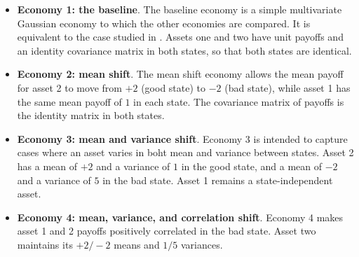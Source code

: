 \documentclass{article}
\begin{document}
\begin{itemize}
    \item \textbf{Economy 1: the baseline}. The baseline economy is a simple multivariate Gaussian economy to which the other economies are compared. It is equivalent to the case studied in \textcite{kacperczyk_rational_2016}. Assets one and two have unit payoffs and an identity covariance matrix in both states, so that both states are identical.
    
    \item \textbf{Economy 2: mean shift}. The mean shift economy allows the mean payoff for asset 2 to move from $+2$ (good state) to $-2$ (bad state), while asset 1 has the same mean payoff of $1$ in each state. The covariance matrix of payoffs is the identity matrix in both states.

    \item \textbf{Economy 3: mean and variance shift}. Economy 3 is intended to capture cases where an asset varies in boht mean and variance between states. Asset 2 has a mean of $+2$ and a variance of $1$ in the good state, and a mean of $-2$ and a variance of $5$ in the bad state. Asset 1 remains a state-independent asset.
    
    \item \textbf{Economy 4: mean, variance, and correlation shift}. Economy 4 makes asset 1 and 2 payoffs positively correlated in the bad state. Asset two maintains its $+2/-2$ means and $1/5$ variances.
\end{itemize}
    
\end{document}
